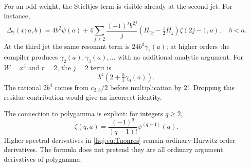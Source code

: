 For an odd weight, the Stieltjes term is visible already at the second
jet. For instance,
\begin{equation}\label{hqj:eq:xsecond}
\Delta_2(x;a,b)=4b^2\psi(a)+
4\sum_{j\ge2}\frac{(-1)^jb^{2j}}j
\left(H_{2j}-\tfrac12H_j\right)\zeta(2j-1,a),\quad b<a.
\end{equation}
At the third jet the same resonant term is
$24b^2\gamma_1(a)$; at higher orders the compiler produces
$\gamma_2(a),\gamma_3(a),\ldots$ with no additional analytic argument.
For $W=x^3$ and $r=2$, the $j=2$ term is
\[
b^4\left(2+\tfrac83\gamma_0(a)\right).
\]
The rational $2b^4$ comes from $c_{2,3}/2$ before multiplication by $2!$.
Dropping this residue contribution would give an incorrect identity.

The connection to polygamma is explicit: for integers $q\ge2$,
\begin{equation}\label{hqj:eq:polygamma-zeta}
\zeta(q,a)=\frac{(-1)^q}{(q-1)!}\psi^{(q-1)}(a).
\end{equation}
Higher spectral derivatives in \eqref{hqj:eq:Tnonres} remain ordinary
Hurwitz order derivatives. The formula does not pretend they are all
ordinary argument derivatives of polygamma.
